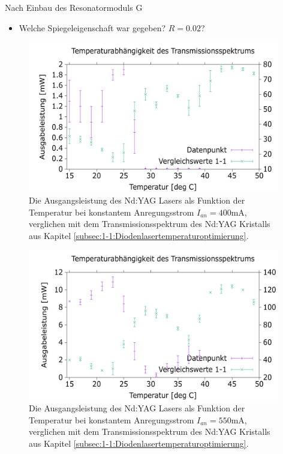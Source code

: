 \documentclass[../../main.tex]{subfiles}
\begin{document}
    
    Nach Einbau des Resonatormoduls G 

    \begin{itemize}[label=$\to$]
        \item Welche Spiegeleigenschaft war gegeben? $R = 0.02$?
    \end{itemize}

    \begin{figure}[H]
        \centering
        \includegraphics[width=11cm]{../../Bilddateien/4/PowerOverTemperature_400mA_comp.png}
        \caption{Die Ausgangsleistung des Nd:YAG Lasers als Funktion der Temperatur bei konstantem Anregungsstrom $I_{\textit{an}} = 400\si{\mA}$, verglichen mit dem Transmissionsspektrum des Nd:YAG Kristalls aus Kapitel \ref{subsec:1-1:Diodenlasertemperaturoptimierung}.}
    \end{figure}

    \begin{figure}[H]
        \centering
        \includegraphics[width=11cm]{../../Bilddateien/4/PowerOverTemperature_550mA_comp.png}
        \caption{Die Ausgangsleistung des Nd:YAG Lasers als Funktion der Temperatur bei konstantem Anregungsstrom $I_{\textit{an}} = 550\si{\mA}$, verglichen mit dem Transmissionsspektrum des Nd:YAG Kristalls aus Kapitel \ref{subsec:1-1:Diodenlasertemperaturoptimierung}.}
    \end{figure}
\end{document}
